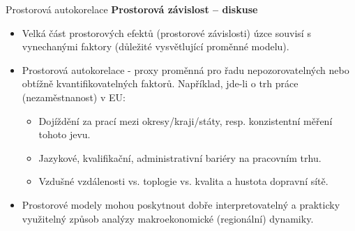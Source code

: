 \documentclass{beamer}
\begin{document}
\begin{frame}{Prostorová autokorelace}
\textbf{Prostorová závislost – diskuse}
\begin{itemize}
	\item Velká část prostorových efektů (prostorové závislosti) úzce souvisí s vynechanými faktory (důležité vysvětlující proměnné modelu).
	
	\item Prostorová autokorelace - proxy proměnná pro řadu nepozorovatelných nebo obtížně kvantifikovatelných faktorů. Například, jde-li o trh práce (nezaměstnanost) v EU: 
	\begin{itemize}
		\item Dojíždění za prací mezi okresy/kraji/státy, resp. konzistentní měření tohoto jevu.
		\item Jazykové, kvalifikační, administrativní bariéry na pracovním trhu.
		\item Vzdušné vzdálenosti vs. toplogie vs. kvalita a hustota dopravní sítě. 
	\end{itemize}
	\item Prostorové modely mohou poskytnout dobře interpretovatelný a prakticky využitelný způsob analýzy makroekonomické (regionální) dynamiky.
\end{itemize}
\end{frame}
\end{document}
